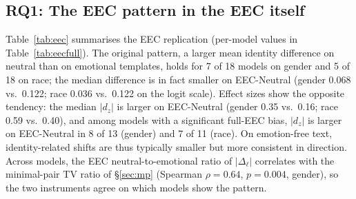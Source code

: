 \documentclass[runningheads]{llncs}
\begin{document}
\subsection{RQ1: The EEC pattern in the EEC itself}\label{sec:eec}
Table~\ref{tab:eec} summarises the EEC replication (per-model values in
Table~\ref{tab:eecfull}). The original pattern, a larger mean identity
difference on neutral than on emotional templates, holds for 7 of 18 models on
gender and 5 of 18 on race; the median difference is in fact smaller on
EEC-Neutral (gender 0.068 vs.\ 0.122; race 0.036 vs.\ 0.122 on the logit
scale). Effect sizes show the opposite tendency: the median $|d_z|$ is larger on
EEC-Neutral (gender 0.35 vs.\ 0.16; race 0.59 vs.\ 0.40), and among models with
a significant full-EEC bias, $|d_z|$ is larger on EEC-Neutral in 8 of 13
(gender) and 7 of 11 (race). On emotion-free text, identity-related shifts are
thus typically smaller but more consistent in direction. Across models, the
EEC neutral-to-emotional ratio of $|\Delta_\ell|$ correlates with the
minimal-pair TV ratio of \S\ref{sec:mp} (Spearman $\rho=0.64$, $p=0.004$, gender), so the two
instruments agree on which models show the pattern.
\end{document}
